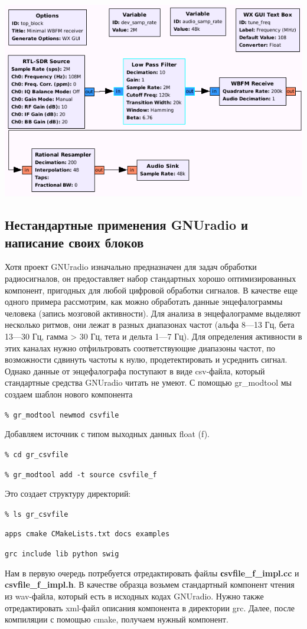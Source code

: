 \documentclass[10pt, a5paper]{article}
\begin{document}
\begin{center}
  \includegraphics[width=\textwidth]{112_2014_w_Adamov_struct.png}
\end{center}

\subsection*{Нестандартные применения GNUradio и написание своих блоков}

Хотя проект GNUradio изначально предназначен для задач обработки радиосигналов, он предоставляет набор стандартных хорошо оптимизированных компонент, пригодных для любой цифровой обработки сигналов. В качестве еще одного примера рассмотрим, как можно обработать данные энцефалограммы человека (запись мозговой активности). Для анализа в энцефалограмме выделяют несколько ритмов, они лежат в разных диапазонах частот (альфа 8---13 Гц, бета 13---30 Гц, гамма \textgreater{} 30 Гц, тета и дельта 1---7 Гц). Для определения активности в этих каналах нужно отфильтровать соответствующие диапазоны частот, по возможности сдвинуть частоты к нулю, продетектировать и усреднить сигнал. Однако данные от энцефалографа поступают в виде csv-файла, который стандартные средства GNUradio читать не умеют. С помощью gr\_modtool мы создаем шаблон нового компонента

\verb!% gr_modtool newmod csvfile!

Добавляем источник с типом выходных данных float (f).

\verb!% cd gr_csvfile!

\verb!% gr_modtool add -t source csvfile_f!

Это создает структуру директорий:

\verb!% ls gr_csvfile!

\verb!apps cmake CMakeLists.txt docs examples!

\verb!grc include lib python swig!

Нам в первую очередь потребуется отредактировать файлы \textbf{сsv\-file\_f\_impl.cc} и \textbf{csvfile\_f\_impl.h}. В качестве образца возьмем стандартный компонент чтения из wav-файла, который есть в исходных кодах GNUradio. Нужно также отредактировать xml-файл описания компонента в директории grc. Далее, после компиляции с помощью cmake, получаем нужный компонент.
\end{document}
